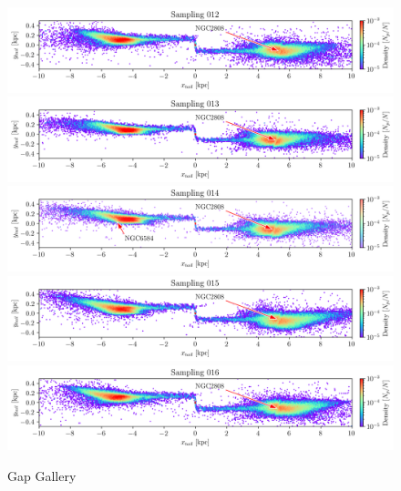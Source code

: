 \documentclass[draft]{aa}
\begin{document}
\begin{appendix}
    \begin{figure}
      \centering
      \includegraphics[width=\linewidth]{gallery_of_gaps_monte-carlo-012.png}
      \includegraphics[width=\linewidth]{gallery_of_gaps_monte-carlo-013.png}
      \includegraphics[width=\linewidth]{gallery_of_gaps_monte-carlo-014.png}      
      \includegraphics[width=\linewidth]{gallery_of_gaps_monte-carlo-015.png}
      \includegraphics[width=\linewidth]{gallery_of_gaps_monte-carlo-016.png}
      \caption{Gap Gallery}
      \label{fig:gallery3}
      \end{figure}        


\end{appendix}
\end{document}
